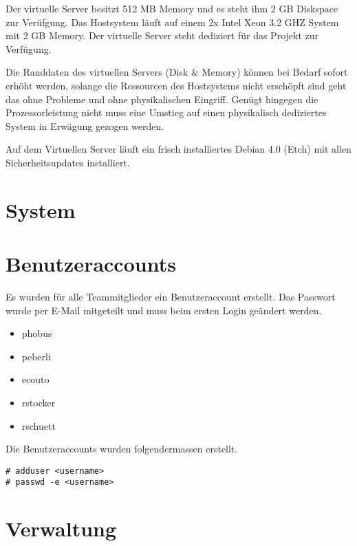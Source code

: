 \documentclass[a4paper,12pt,halfparskip,DIV14]{scrreprt}
\begin{document}
Der virtuelle Server besitzt 512 MB Memory und es steht ihm 2 GB Diskspace zur Verüfgung. Das Hostsystem läuft auf einem 2x Intel Xeon 3.2 GHZ System mit 2 GB Memory. Der virtuelle Server steht dediziert für das Projekt zur Verfügung.

Die Randdaten des virtuellen Servers (Disk \& Memory) können bei Bedarf sofort erhöht werden, solange die Ressourcen des Hostsystems nicht erschöpft sind geht das ohne Probleme und ohne physikalischen Eingriff. Genügt hingegen die Prozessorleistung nicht muss eine Umstieg auf einen physikalisch dediziertes System in Erwägung gezogen werden.

Auf dem Virtuellen Server läuft ein frisch installiertes Debian 4.0 (Etch) mit allen Sicherheitsupdates installiert.


\section{System} %
\label{sec:system}


\section{Benutzeraccounts} %
\label{sec:benutzeraccounts}

Es wurden für alle Teammitglieder ein Benutzeraccount erstellt. Das Passwort wurde per E-Mail mitgeteilt und muss beim ersten Login geändert werden.

\begin{itemize}
  \item phobus
  \item peberli
  \item ecouto
  \item rstocker
  \item rschuett
\end{itemize}

Die Benutzeraccounts wurden folgendermassen erstellt. 

\begin{verbatim}
# adduser <username>
# passwd -e <username>
\end{verbatim}


\section{Verwaltung} %
\label{sec:verwaltung}
\end{document}
